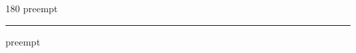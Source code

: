 
\begin{frame}
\begin{center}
\begin{turn}{180}
{\fontsize{2.5cm}{1em}\selectfont preempt}
\end{turn}
\vspace{1em}\par  
\hrule
\vspace{1em}\par  
{\fontsize{2.5cm}{1em}\selectfont preempt}
\end{center}
\end{frame}

